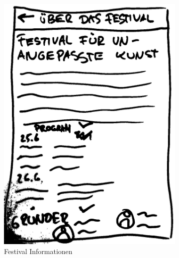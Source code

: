 \begin{figure}[width = 0.45\textwidth]
    \centering
    \begin{subfigure}[b]{0.22\textwidth}
        \includegraphics[width=\textwidth]{figures/festival-infos.jpg}
        \caption{Festival Informationen}
        \label{fig:gull}
    \end{subfigure}
    \begin{subfigure}[b]{0.22\textwidth}

\end{subfigure}
\end{figure}
